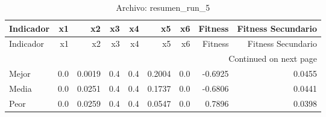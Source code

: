 \begin{longtable}{lrrrrrrrr}
\caption{Archivo: resumen\_run\_5}\label{tab:resumen_run_5} \\
\toprule
Indicador & x1 & x2 & x3 & x4 & x5 & x6 & Fitness & Fitness Secundario \\
\midrule
\endfirsthead
\toprule
Indicador & x1 & x2 & x3 & x4 & x5 & x6 & Fitness & Fitness Secundario \\
\midrule
\endhead
\midrule
\multicolumn{9}{r}{Continued on next page} \\
\midrule
\endfoot
\bottomrule
\endlastfoot
Mejor & 0.0 & 0.0019 & 0.4 & 0.4 & 0.2004 & 0.0 & -0.6925 & 0.0455 \\
Media & 0.0 & 0.0251 & 0.4 & 0.4 & 0.1737 & 0.0 & -0.6806 & 0.0441 \\
Peor & 0.0 & 0.0259 & 0.4 & 0.4 & 0.0547 & 0.0 & 0.7896 & 0.0398 \\
\end{longtable}